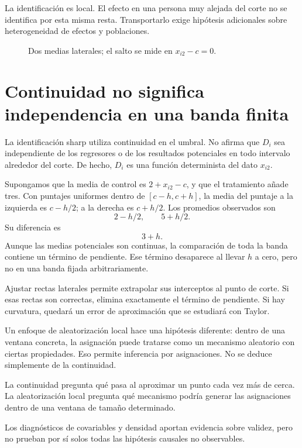 \documentclass[11pt,a4paper]{article}
\begin{document}
La identificación es local.
El efecto en una persona muy alejada del corte
no se identifica por esta misma resta.
Transportarlo exige hipótesis adicionales
sobre heterogeneidad de efectos y poblaciones.

\begin{figure}[H]\centering
{}
\caption{Dos medias laterales; el salto se mide en \(x_{i2}-c=0\).}
\end{figure}

\clearpage
\section{Continuidad no significa independencia en una banda finita}\label{unidad21}
La identificación sharp utiliza continuidad en el umbral.
No afirma que \(D_i\) sea independiente de los
regresores o de los resultados potenciales
en todo intervalo alrededor del corte.
De hecho, \(D_i\) es una función determinista
del dato \(x_{i2}\).

Supongamos que la media de control es
\(2+x_{i2}-c\), y que el tratamiento añade tres.
Con puntajes uniformes dentro de \([c-h,c+h]\),
la media del puntaje a la izquierda es \(c-h/2\);
a la derecha es \(c+h/2\).
Los promedios observados son
\[
2-h/2,\qquad 5+h/2.
\]
Su diferencia es
\[
3+h.
\]
Aunque las medias potenciales son continuas,
la comparación de toda la banda contiene
un término de pendiente.
Ese término desaparece al llevar \(h\) a cero,
pero no en una banda fijada arbitrariamente.

Ajustar rectas laterales permite extrapolar
sus interceptos al punto de corte.
Si esas rectas son correctas, elimina
exactamente el término de pendiente.
Si hay curvatura, quedará un error de
aproximación que se estudiará con Taylor.

Un enfoque de aleatorización local hace
una hipótesis diferente: dentro de una
ventana concreta, la asignación puede
tratarse como un mecanismo aleatorio
con ciertas propiedades.
Eso permite inferencia por asignaciones.
No se deduce simplemente de la continuidad.

\begin{ejemplo}
La continuidad pregunta qué pasa al aproximar
un punto cada vez más de cerca.
La aleatorización local pregunta qué mecanismo
podría generar las asignaciones dentro
de una ventana de tamaño determinado.
\end{ejemplo}
Los diagnósticos de covariables y densidad
aportan evidencia sobre validez,
pero no prueban por sí solos todas
las hipótesis causales no observables.
\end{document}

